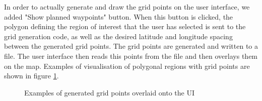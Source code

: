 In order to actually generate and draw the grid points on the user interface, we added "Show planned waypoints" button. When this button is clicked, the polygon defining the region of interest that the user has selected is sent to the grid generation code, as well as the desired latitude and longitude spacing between the generated grid points. The grid points are generated and written to a file. The user interface then reads this points from the file and then overlays them on the map. Examples of visualisation of polygonal regions with grid points are shown in figure \ref{fig:GridPointsOnUI}.
\begin{figure}{}
\centering
{}
\hspace{0.2em}
\caption{Examples of generated grid points overlaid onto the UI}
\label{fig:GridPointsOnUI}
\end{figure}

















